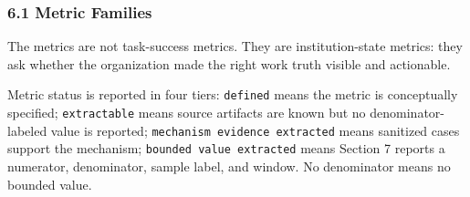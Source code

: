 \documentclass[
]{article}
\begin{document}
\subsubsection{6.1 Metric Families}\label{metric-families}

The metrics are not task-success metrics. They are institution-state metrics: they ask whether the organization made the right work truth visible and actionable.

Metric status is reported in four tiers: \texttt{defined} means the metric is conceptually specified; \texttt{extractable} means source artifacts are known but no denominator-labeled value is reported; \texttt{mechanism\ evidence\ extracted} means sanitized cases support the mechanism; \texttt{bounded\ value\ extracted} means Section 7 reports a numerator, denominator, sample label, and window. No denominator means no bounded value.
\end{document}
